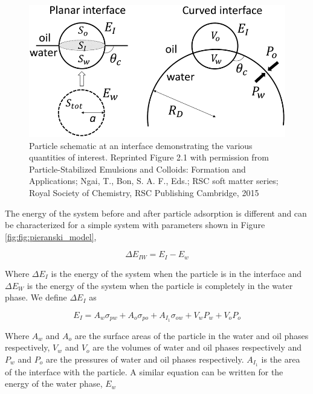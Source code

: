 \begin{figure}
    \centering
    \includegraphics[scale = 0.5]{../figures/literature_review/particle_at_interface.png }
    \caption{Particle schematic at an interface demonstrating the various quantities of interest. Reprinted Figure 2.1 with permission from
             Particle-Stabilized Emulsions and Colloids: Formation and Applications; Ngai, T., Bon, S. A. F., Eds.; RSC soft matter series; 
             Royal Society of Chemistry, RSC Publishing Cambridge, 2015}
    \label{fig:pieranski_model}
\end{figure}

The energy of the system before and after particle adsorption is different and can be characterized for a simple system with parameters shown in Figure \ref{fig:fig:pieranski_model},

\begin{equation}
    \Delta E_{IW} = E_I - E_w
\end{equation}

Where $\Delta E_{I}$ is the energy of the system when the particle is in the interface and $\Delta E_W$ is the energy of the system when the particle is completely in the water phase.
We define $\Delta E_{I}$ as

\begin{equation}
    E_I = A_w \sigma_{pw} + A_o\sigma_{po} + A_{I_1}\sigma_{ow} + V_w P_w + V_o P_o
\end{equation}

Where $A_w$ and $A_o$ are the surface areas of the particle in the water and oil phases respectively, $V_w$ and $V_o$ are the volumes of water and oil phases respectively and 
$P_w$ and $P_o$ are the pressures of water and oil phases respectively. $A_{I_1}$ is the area of the interface with the particle. 
A similar equation can be written for the energy of the water phase, $E_w$

